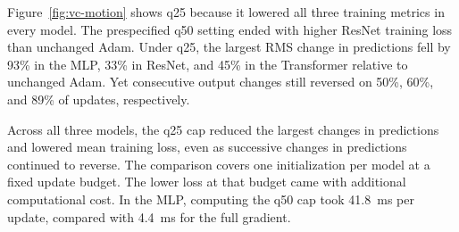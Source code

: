 Figure~\ref{fig:vc-motion} shows q25 because it lowered all three training metrics in every model. The prespecified q50 setting ended with higher ResNet training loss than unchanged Adam. Under q25, the largest RMS change in predictions fell by 93\% in the MLP, 33\% in ResNet, and 45\% in the Transformer relative to unchanged Adam. Yet consecutive output changes still reversed on 50\%, 60\%, and 89\% of updates, respectively.

Across all three models, the q25 cap reduced the largest changes in predictions and lowered mean training loss, even as successive changes in predictions continued to reverse. The comparison covers one initialization per model at a fixed update budget. The lower loss at that budget came with additional computational cost. In the MLP, computing the q50 cap took 41.8~ms per update, compared with 4.4~ms for the full gradient.

